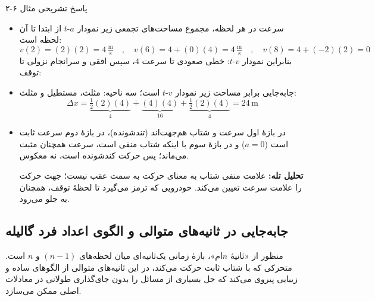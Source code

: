 \documentclass[12pt, a4paper]{article}
\begin{document}
\begin{answerbox}{پاسخ تشریحی مثال ۶-۲}
\begin{itemize}
    \item[الف)] سرعت در هر لحظه، مجموع مساحت‌های تجمعی زیر نمودار $a$-$t$ از ابتدا تا آن لحظه است:
    \[
    v(2) = (2)(2) = 4\,\tfrac{\text{m}}{\text{s}}
    \quad , \quad
    v(6) = 4 + (0)(4) = 4\,\tfrac{\text{m}}{\text{s}}
    \quad , \quad
    v(8) = 4 + (-2)(2) = 0
    \]
    بنابراین نمودار $v$-$t$: خطی صعودی تا سرعت $4$، سپس افقی و سرانجام نزولی تا توقف:

\begin{center}
\end{center}

    \item[ب)] جابه‌جایی برابر مساحت زیر نمودار $v$-$t$ است؛ سه ناحیه: مثلث، مستطیل و مثلث:
    \[
    \Delta x = \underbrace{\tfrac{1}{2}(2)(4)}_{4} + \underbrace{(4)(4)}_{16} + \underbrace{\tfrac{1}{2}(2)(4)}_{4} = 24\,\text{m}
    \]

    \item[پ)] در بازهٔ اول سرعت و شتاب هم‌جهت‌اند (تندشونده)، در بازهٔ دوم سرعت ثابت است ($a=0$) و در بازهٔ سوم با اینکه شتاب منفی است، سرعت همچنان مثبت می‌ماند؛ پس حرکت کندشونده است، نه معکوس.

    \textbf{تحلیل تله:} علامت منفی شتاب به معنای حرکت به سمت عقب نیست؛ جهت حرکت را علامت سرعت تعیین می‌کند. خودرویی که ترمز می‌گیرد تا لحظهٔ توقف، همچنان به جلو می‌رود.
\end{itemize}
\end{answerbox}

\subsection{جابه‌جایی در ثانیه‌های متوالی و الگوی اعداد فرد گالیله}
منظور از «ثانیهٔ $n$‌ام»، بازهٔ زمانی یک‌ثانیه‌ای میان لحظه‌های $(n-1)$ و $n$ است. متحرکی که با شتاب ثابت حرکت می‌کند، در این ثانیه‌های متوالی از الگوهای ساده و زیبایی پیروی می‌کند که حل بسیاری از مسائل را بدون جای‌گذاری طولانی در معادلات اصلی ممکن می‌سازد.
\end{document}
